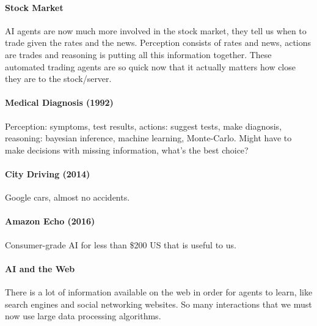 \documentclass[12 pt]{article}
\begin{document}
            \paragraph{Stock Market} AI agents are now much more
            involved in the stock market, they tell us when to trade
            given the rates and the news. Perception consists of rates
            and news, actions are trades and reasoning is putting all
            this information together. These automated trading agents
            are so quick now that it actually matters how close they
            are to the stock/server.
            \paragraph{Medical Diagnosis (1992)} Perception: symptoms,
            test results, actions: suggest tests, make diagnosis,
            reasoning: bayesian inference, machine learning,
            Monte-Carlo. Might have to make decisions with missing
            information, what's the best choice?
            \paragraph{City Driving (2014)} Google cars, almost no
            accidents.
            \paragraph{Amazon Echo (2016)} Consumer-grade AI for less
            than \$200 US that is useful to us.
            \paragraph{AI and the Web} There is a lot of information
            available on the web in order for agents to learn, like
            search engines and social networking websites. So many
            interactions that we must now use large data processing algorithms.
\end{document}
